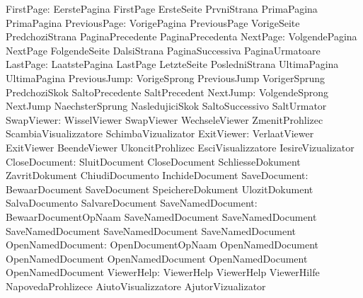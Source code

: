                 FirstPage: EerstePagina              FirstPage
                           ErsteSeite                PrvniStrana
                           PrimaPagina               PrimaPagina
             PreviousPage: VorigePagina              PreviousPage
                           VorigeSeite               PredchoziStrana
                           PaginaPrecedente          PaginaPrecedenta
                 NextPage: VolgendePagina            NextPage
                           FolgendeSeite             DalsiStrana
                           PaginaSuccessiva          PaginaUrmatoare
                 LastPage: LaatstePagina             LastPage
                           LetzteSeite               PosledniStrana
                           UltimaPagina              UltimaPagina
             PreviousJump: VorigeSprong              PreviousJump
                           VorigerSprung             PredchoziSkok
                           SaltoPrecedente           SaltPrecedent
                 NextJump: VolgendeSprong            NextJump
                           NaechsterSprung           NasledujiciSkok
                           SaltoSuccessivo           SaltUrmator
               SwapViewer: WisselViewer              SwapViewer
                           WechseleViewer            ZmenitProhlizec
                           ScambiaVisualizzatore     SchimbaVizualizator
               ExitViewer: VerlaatViewer             ExitViewer
                           BeendeViewer              UkoncitProhlizec
                           EsciVisualizzatore        IesireVizualizator
            CloseDocument: SluitDocument             CloseDocument
                           SchliesseDokument         ZavritDokument
                           ChiudiDocumento           InchideDocument
             SaveDocument: BewaarDocument            SaveDocument
                           SpeichereDokument         UlozitDokument
                           SalvaDocumento            SalvareDocument
        SaveNamedDocument: BewaarDocumentOpNaam      SaveNamedDocument
                           SaveNamedDocument         SaveNamedDocument
                           SaveNamedDocument         SaveNamedDocument
        OpenNamedDocument: OpenDocumentOpNaam        OpenNamedDocument
                           OpenNamedDocument         OpenNamedDocument
                           OpenNamedDocument         OpenNamedDocument
               ViewerHelp: ViewerHelp                ViewerHelp
                           ViewerHilfe               NapovedaProhlizece
                           AiutoVisualizzatore       AjutorVizualizator
